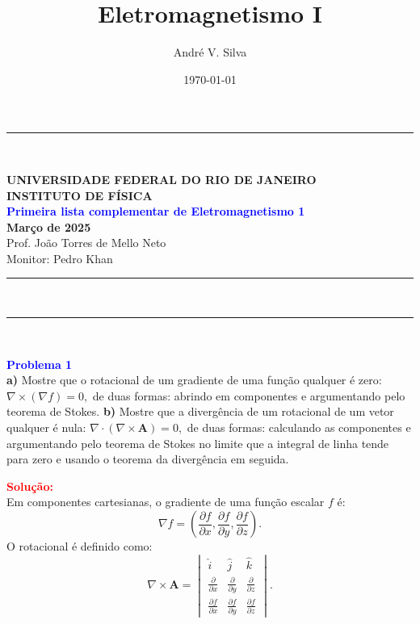 \documentclass[a4paper,12pt]{article}
\title{ \textbf{\large Eletromagnetismo I }}
\author{Andr\'e V. Silva}
\date{\today}
\begin{document}
\noindent\rule{\linewidth}{0.8pt}\\
\begin{center}
    \textbf{UNIVERSIDADE FEDERAL DO RIO DE JANEIRO}\\
    \textbf{INSTITUTO DE FÍSICA}\\
    \textbf{\textcolor{blue}{Primeira lista complementar de Eletromagnetismo 1}}\\
    \textbf{Março de 2025}\\
    \vspace{0.5cm}
    Prof. João Torres de Mello Neto\\
    Monitor: Pedro Khan
\end{center}
\noindent\rule{\linewidth}{0.8pt}\\
\maketitle


\noindent\rule{\linewidth}{0.4pt}\\

\justifying

\begin{flushleft}
\textbf{\textcolor{blue}{Problema 1}}\\
\textbf{a)} Mostre que o rotacional de um gradiente de uma função qualquer é zero:
$\nabla \times (\nabla f) = 0,$ de duas formas: abrindo em componentes e 
argumentando pelo teorema de Stokes. 
\textbf{b)} Mostre que a divergência de um rotacional de um vetor qualquer é nula:
$\nabla \cdot (\nabla \times \mathbf{A}) = 0,$ de duas formas: calculando as 
componentes e argumentando pelo teorema de Stokes no limite que a integral de 
linha tende para zero e usando o teorema da divergência em seguida.
\end{flushleft}

\textcolor{red}{\textbf{Solução:}}\\

Em componentes cartesianas, o gradiente de uma função escalar $f$ é:
\begin{equation}
    \nabla f = \left( \frac{\partial f}{\partial x}, \frac{\partial f}{\partial y}, \frac{\partial f}{\partial z} \right).
\end{equation}
O rotacional é definido como:
\begin{equation}
    \nabla \times \mathbf{A} = 
    \begin{vmatrix} 
        \hat{i} & \hat{j} & \hat{k} \\
        \frac{\partial}{\partial x} & \frac{\partial}{\partial y} & \frac{\partial}{\partial z} \\
        \frac{\partial f}{\partial x} & \frac{\partial f}{\partial y} & \frac{\partial f}{\partial z} 
    \end{vmatrix}.
\end{equation}
\end{document}
